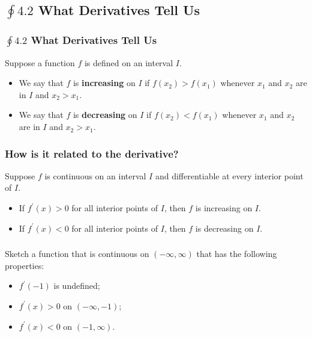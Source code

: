 \documentclass[14pt]{beamer}
\begin{document}
\begin{frame}
\subsection[$\oint 4.2$ What Derivatives Tell Us]{$\oint 4.2$ What Derivatives Tell Us}
\frametitle{$\oint 4.2$ What Derivatives Tell Us}
\begin{dfn} Suppose a function $f$ is defined on an interval $I$.
\begin{itemize}
\item We say that $f$ is {\bf increasing} on $I$ if $f(x_2)>f(x_1)$ whenever $x_1$ and $x_2$ are in $I$ and $x_2 > x_1$.
\item We say that $f$ is {\bf decreasing} on $I$ if $f(x_2)<f(x_1)$ whenever $x_1$ and $x_2$ are in $I$ and $x_2 > x_1$.
\end{itemize}
\end{dfn}
\end{frame}

\begin{frame}
\frametitle{\small How is it related to the derivative?}
Suppose $f$ is continuous on an interval $I$ and differentiable at every interior point of $I$.

\vspace{1pc}
\begin{itemize}
\item If \alert{$f^{\prime}(x)>0$} for all interior points of $I$, then $f$ is \alert{increasing} on $I$.

\vspace{1pc}
\item If \alert{$f^{\prime}(x)<0$} for all interior points of $I$, then $f$ is \alert{decreasing} on $I$.
\end{itemize}
\end{frame}

\begin{frame}%
\frametitle{}
\begin{ex} Sketch a function that is continuous on $(-\infty,\infty)$ that has the following properties:

\begin{itemize}
\item $f^{\prime}(-1)$ is undefined;

\vspace{1pc}
\item $f^{\prime}(x)>0$ on $(-\infty,-1)$;

\vspace{1pc}
\item $f^{\prime}(x)<0$ on $(-1,\infty)$.
\end{itemize}
\end{ex}
\end{frame}
\end{document}
